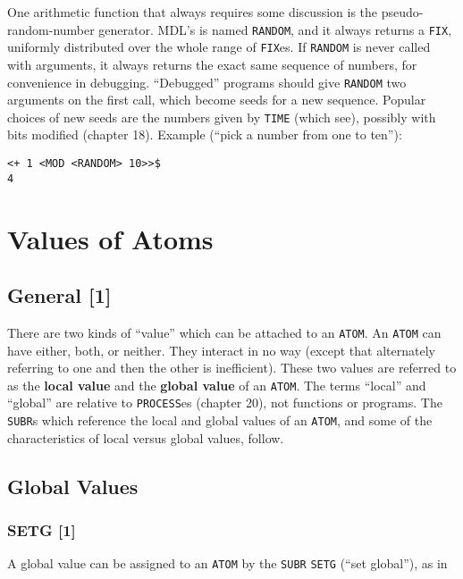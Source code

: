 \documentclass[a4paper]{scrbook}
\begin{document}
One arithmetic function that always requires some discussion is the pseudo-random-number generator. MDL's is named
\texttt{RANDOM}, and it always returns a \texttt{FIX}, uniformly distributed over the whole
range of \texttt{FIX}es. If \texttt{RANDOM} is never called with arguments, it always returns the exact same sequence of
numbers, for convenience in debugging. ``Debugged'' programs should give \texttt{RANDOM} two arguments on the first call,
which become seeds for a new sequence. Popular choices of new seeds are the numbers given by \texttt{TIME} (which see),
possibly with bits modified (chapter 18). Example (``pick a number from one to ten''):

\begin{verbatim}
<+ 1 <MOD <RANDOM> 10>>$
4
\end{verbatim}

\chapter{Values of Atoms}\label{chapter-4.-values-of-atoms}

\section{General {[}1{]}}\label{general-1-1}

There are two kinds of ``value'' which can be attached to an \texttt{ATOM}. An \texttt{ATOM} can have either, both, or
neither. They interact in no way (except that alternately referring to one and then the other is inefficient). These two
values are referred to as the \textbf{local value} and the \textbf{global value} of an \texttt{ATOM}. The terms ``local''
and ``global'' are relative to \texttt{PROCESS}es (chapter 20), not functions or programs. The \texttt{SUBR}s which
reference the local and global values of an \texttt{ATOM}, and some of the characteristics of local versus global values,
follow.

\section{Global Values}\label{global-values}

\subsection{SETG {[}1{]}}\label{setg-1}

A global value can be assigned to an \texttt{ATOM} by the \texttt{SUBR} \texttt{SETG} (``set
global''), as in
\end{document}
